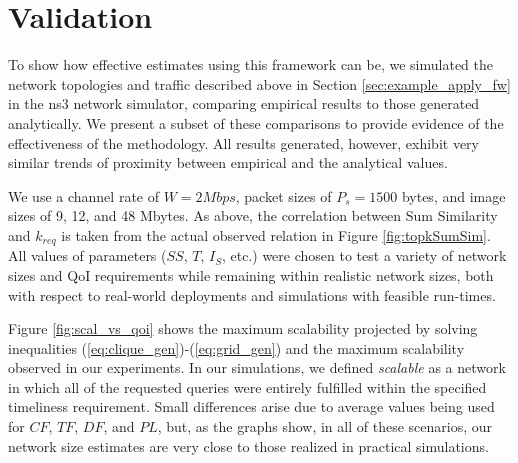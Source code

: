 
\section{Validation}
\label{sec:validation}


To show how effective estimates using this framework can be, we simulated the network topologies and traffic described above in Section \ref{sec:example_apply_fw} in the ns3 network simulator, comparing empirical results to those generated analytically.  We present a subset of these comparisons to provide evidence of the effectiveness of the methodology.  All results generated, however, exhibit very similar trends of proximity between empirical and the analytical values.

We use a channel rate of $W= 2 Mbps$, packet sizes of $P_s = 1500$ bytes, and image sizes of 9, 12, and 48 Mbytes.  As above, the correlation between Sum Similarity and $k_{req}$ is taken from the actual observed relation in Figure \ref{fig:topkSumSim}.  All values of parameters ($SS$, $T$, $I_S$, etc.) were chosen to test a variety of network sizes and QoI requirements while remaining within realistic network sizes, both with respect to real-world deployments and simulations with feasible run-times.

Figure \ref{fig:scal_vs_qoi} shows the maximum scalability projected by solving inequalities (\ref{eq:clique_gen})-(\ref{eq:grid_gen}) and the maximum scalability observed in our experiments.  In our simulations, we defined \emph{scalable} as a network in which all of the requested queries were entirely fulfilled within the specified timeliness requirement.  Small differences arise due to average values being used for $CF$, $TF$, $DF$, and $PL$, but, as the graphs show, in all of these scenarios, our network size estimates are very close to those realized in practical simulations.



